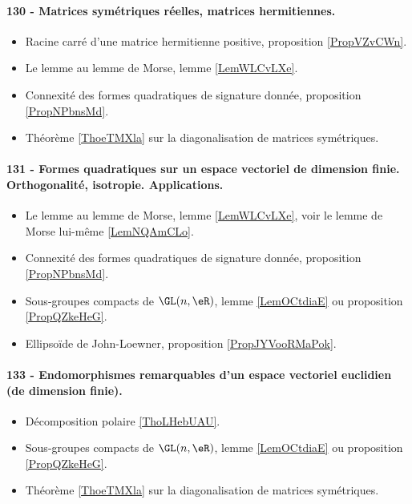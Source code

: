\paragraph{130 - Matrices symétriques réelles, matrices hermitiennes.}
\begin{itemize}
    \item Racine carré d'une matrice hermitienne positive, proposition \ref{PropVZvCWn}.
    \item Le lemme au lemme de Morse, lemme \ref{LemWLCvLXe}.
    \item Connexité des formes quadratiques de signature donnée, proposition \ref{PropNPbnsMd}.
    \item Théorème \ref{ThoeTMXla} sur la diagonalisation de matrices symétriques.
\end{itemize}
\paragraph{131 - Formes quadratiques sur un espace vectoriel de dimension finie. Orthogonalité, isotropie. Applications.}
\begin{itemize}
    \item Le lemme au lemme de Morse, lemme \ref{LemWLCvLXe}, voir le lemme de Morse lui-même \ref{LemNQAmCLo}.
    \item Connexité des formes quadratiques de signature donnée, proposition \ref{PropNPbnsMd}.
    \item Sous-groupes compacts de \( \GL(n,\eR)\), lemme \ref{LemOCtdiaE} ou proposition \ref{PropQZkeHeG}.
    \item Ellipsoïde de John-Loewner, proposition \ref{PropJYVooRMaPok}.
\end{itemize}

\paragraph{133 - Endomorphismes remarquables d’un espace vectoriel euclidien (de dimension finie).}
\begin{itemize}
    \item Décomposition polaire \ref{ThoLHebUAU}.
    \item Sous-groupes compacts de \( \GL(n,\eR)\), lemme \ref{LemOCtdiaE} ou proposition \ref{PropQZkeHeG}.
    \item Théorème \ref{ThoeTMXla} sur la diagonalisation de matrices symétriques.
\end{itemize}
